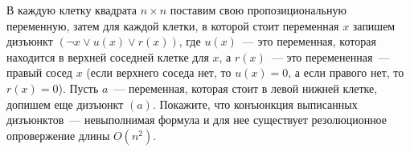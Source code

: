 В каждую клетку квадрата $n \times n$ поставим свою пропозициональную переменную, затем для каждой клетки, в которой стоит
переменная $x$ запишем дизъюнкт $(\lnot x \lor u(x) \lor r(x))$, где $u(x)$~--- это переменная, которая находится в верхней
соседней клетке для $x$, а $r(x)$~--- это перемененная~--- правый сосед $x$ (если верхнего соседа нет, то $u(x) = 0$, а если
правого нет, то $r(x) = 0$). Пусть $a$~--- переменная, которая стоит в левой нижней клетке, допишем еще дизъюнкт
$(a)$. Покажите, что конъюнкция выписанных дизъюнктов~--- невыполнимая формула и для нее существует резолюционное
опровержение длины $O(n^2)$.